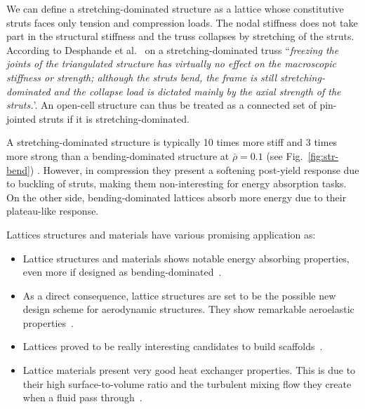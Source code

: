 We can define a stretching-dominated structure as a lattice whose constitutive struts faces only tension and compression loads. The nodal stiffness does not take part in the structural stiffness and the truss collapses by stretching of the struts. According to Desphande et al.~ on a stretching-dominated truss ``\textit{freezing the joints of the triangulated structure has virtually no effect on the macroscopic stiffness or strength; although the struts bend, the frame is still stretching-dominated and the collapse load is dictated mainly by the axial strength of the struts.}'. An open-cell structure can thus be treated as a connected set of pin-jointed struts if it is stretching-dominated.

A stretching-dominated structure is typically 10 times more stiff and 3 times more strong than a bending-dominated structure at $\bar{\rho} = 0.1$ (see Fig.~\ref{fig:str-bend}) \cite{deshpande_foam_2001}. However, in compression they present a softening post-yield response due to buckling of struts, making them non-interesting for energy absorption tasks. On the other side, bending-dominated lattices absorb more energy due to their plateau-like response.


Lattices structures and materials have various promising application as:
\begin{itemize}
    \item Lattice structures and materials shows notable energy absorbing properties, even more if designed as bending-dominated~.
    \item As a direct consequence, lattice structures are set to be the possible new design scheme for aerodynamic structures. They show remarkable aeroelastic properties~.
    \item Lattices proved to be really interesting candidates to build scaffolds~.
    \item Lattice materials present very good heat exchanger properties. This is due to their high surface-to-volume ratio and the turbulent mixing flow they create when a fluid pass through~.
\end{itemize}

